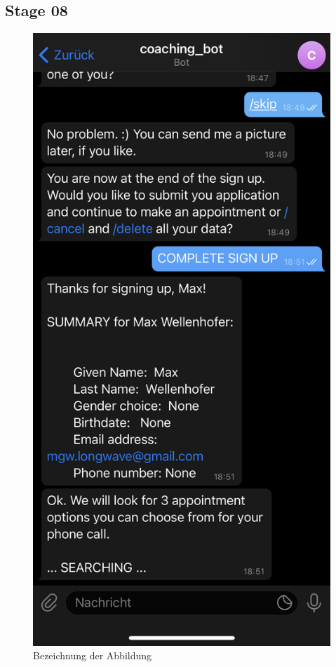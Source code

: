 \subsection{Stage 08}
\begin{figure} %
	\centering
	\includegraphics{images/coaching_bot_dummy_screenshot.jpeg}
	\caption{Bezeichnung der Abbildung}
	\label{a9}
\end{figure}


